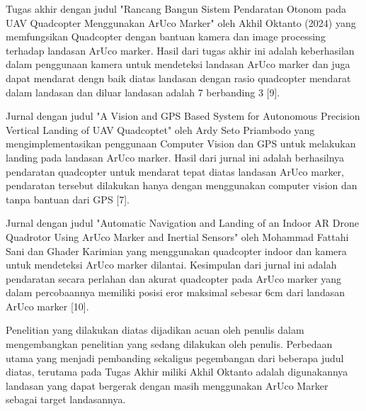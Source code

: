 \begin{packed_enum}
	\item Tugas akhir dengan judul "Rancang Bangun Sistem Pendaratan Otonom pada UAV Quadcopter Menggunakan ArUco Marker" oleh Akhil Oktanto (2024) yang memfungsikan Quadcopter dengan bantuan kamera dan image processing terhadap landasan ArUco marker. Hasil dari tugas akhir ini adalah keberhasilan dalam penggunaan kamera untuk mendeteksi landasan ArUco marker dan juga dapat mendarat dengn baik diatas landasan dengan rasio quadcopter mendarat dalam landasan dan diluar landasan adalah 7 berbanding 3 [9].
	\item Jurnal dengan judul "A Vision and GPS Based System for Autonomous Precision Vertical Landing of UAV Quadcoptet" oleh Ardy Seto Priambodo yang mengimplementasikan penggunaan Computer Vision dan GPS untuk melakukan landing pada landasan ArUco marker. Hasil dari jurnal ini adalah berhasilnya pendaratan quadcopter untuk mendarat tepat diatas landasan ArUco marker, pendaratan tersebut dilakukan hanya dengan menggunakan computer vision dan tanpa bantuan dari GPS [7].
	\item Jurnal dengan judul "Automatic Navigation and Landing of an Indoor AR Drone Quadrotor Using ArUco Marker and Inertial Sensors" oleh Mohammad Fattahi Sani dan Ghader Karimian yang menggunakan quadcopter indoor dan kamera untuk mendeteksi ArUco marker dilantai. Kesimpulan dari jurnal ini adalah pendaratan secara perlahan dan akurat quadcopter pada ArUco marker yang dalam percobaannya memiliki posisi eror maksimal sebesar 6cm dari landasan ArUco marker [10].
	
	Penelitian yang dilakukan diatas dijadikan acuan oleh penulis dalam mengembangkan penelitian  yang sedang dilakukan oleh penulis. Perbedaan utama yang menjadi pembanding sekaligus pegembangan dari beberapa judul diatas, terutama pada Tugas Akhir miliki Akhil Oktanto adalah digunakannya landasan yang dapat bergerak dengan masih menggunakan ArUco Marker sebagai target landasannya.
\end{packed_enum}
